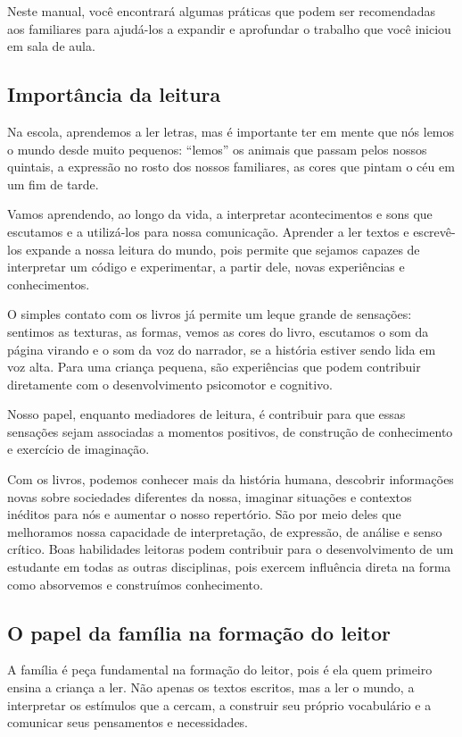 \documentclass[11pt]{extarticle}
\begin{document}
Neste manual, você encontrará algumas práticas que podem ser 
recomendadas aos familiares para ajudá-los a expandir e aprofundar o trabalho 
que você iniciou em sala de aula.


\subsection{Importância da leitura}
Na escola, aprendemos a ler letras, mas é importante ter em mente que nós 
lemos o mundo desde muito pequenos: “lemos” os animais que passam pelos nossos 
quintais, a expressão no rosto dos nossos familiares, as cores que pintam o céu 
em um fim de tarde. 

Vamos aprendendo, ao longo da vida, a interpretar acontecimentos 
e sons que escutamos e a utilizá-los para nossa comunicação. Aprender a ler textos e 
escrevê-los expande a nossa leitura do mundo, pois permite que sejamos capazes de 
interpretar um código e experimentar, a partir dele, novas experiências e conhecimentos. 

O simples contato com os livros já permite um leque grande de sensações: 
sentimos as texturas, as formas, vemos as cores do livro, escutamos o som da página 
virando e o som da voz do narrador, se a história estiver sendo lida em voz alta. Para uma 
criança pequena, são experiências que podem contribuir diretamente com o desenvolvimento psicomotor 
e cognitivo. 

Nosso papel, enquanto mediadores de leitura, é contribuir para que essas 
sensações sejam associadas a momentos positivos, de construção de 
conhecimento e exercício de imaginação. 

Com os livros, podemos conhecer mais da história humana, descobrir informações 
novas sobre sociedades diferentes da nossa, imaginar situações e contextos inéditos 
para nós e aumentar o nosso repertório. São por meio deles que melhoramos nossa 
capacidade de interpretação, de expressão, de análise e senso crítico. Boas habilidades 
leitoras podem contribuir para o desenvolvimento de um estudante em todas as outras 
disciplinas, pois exercem influência direta na forma como absorvemos e 
construímos conhecimento.


\subsection{O papel da família na formação do leitor}
A família é peça fundamental na formação do leitor, pois é ela quem primeiro 
ensina a criança a ler. Não apenas os textos escritos, mas a ler o mundo, a 
interpretar os estímulos que a cercam, a construir seu próprio vocabulário e a 
comunicar seus pensamentos e necessidades.
\end{document}
